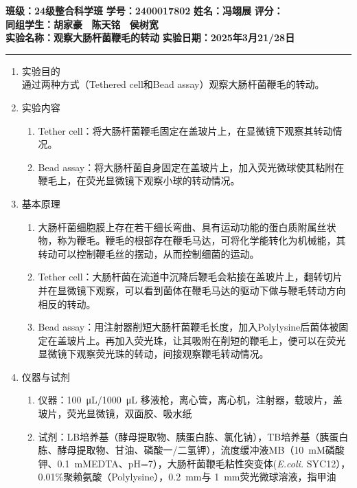 \documentclass[a4paper]{article}
\begin{document}
\noindent\textbf{班级：24级整合科学班} \hspace{1cm} \textbf{学号：2400017802} \hspace{1cm} \textbf{姓名：冯翊展} \hspace{1cm} \textbf{评分：}\\
\textbf{同组学生：胡家豪 \ 陈天铭 \ 侯树宽} \\
\textbf{实验名称：观察大肠杆菌鞭毛的转动}   \hfill \textbf{实验日期：2025年3月21/28日} 

\hrule
\vspace{3mm}

\begin{enumerate}[label=\chinese*.,left=0pt]
    \item 实验目的
    \\
    通过两种⽅式（Tethered cell和Bead assay）观察⼤肠杆菌鞭⽑的转动。
    
    \item 实验内容
    \begin{enumerate}[label=\arabic*.,left = 0pt]
        \item Tether cell：将⼤肠杆菌鞭⽑固定在盖玻⽚上，在显微镜下观察其转动情况。
        \item Bead assay：将大肠杆菌自身固定在盖玻片上，加入荧光微球使其粘附在鞭毛上，在荧光显微镜下观察小球的转动情况。
    \end{enumerate}
    
    \item 基本原理
    \begin{enumerate}[label=\arabic*.,left = 0pt]
        \item ⼤肠杆菌细胞膜上存在若⼲细长弯曲、具有运动功能的蛋白质附属丝状物，称为鞭毛。鞭毛的根部存在鞭毛马达，可将化学能转化为机械能，其转动可以控制鞭毛丝的摆动，从而控制细菌的运动。
        \item Tether cell：大肠杆菌在流道中沉降后鞭⽑会粘接在盖玻⽚上，翻转切⽚并在显微镜下观察，可以看到菌体在鞭⽑⻢达的驱动下做与鞭⽑转动⽅向相反的转动。
        \item Bead assay：⽤注射器削短⼤肠杆菌鞭⽑⻓度，加入Polylysine后菌体被固定在盖玻⽚上。再加⼊荧光珠，让其吸附在削短的鞭⽑上，便可以在荧光显微镜下观察荧光珠的转动，间接观察鞭⽑转动情况。
    \end{enumerate}
    
    \item 仪器与试剂
    \begin{enumerate}[label = \arabic*., left = 0pt]
        \item 仪器：\qty{100}{\micro \L}/\qty{1000}{\micro \L} 移液枪，离心管，离心机，注射器，载玻片，盖玻片，荧光显微镜，双⾯胶、吸⽔纸
        \item 试剂：LB培养基（酵母提取物、胰蛋白胨、氯化钠），TB培养基（胰蛋白胨、酵母提取物、甘油、磷酸一/二氢钾），流度缓冲液MB（\qty{10}{\milli M}磷酸钾、\qty{0.1}{\milli M}EDTA、pH=7），大肠杆菌鞭毛粘性突变体(\textit{E.coli.} SYC12），0.01\%聚赖氨酸（Polylysine），\qty{0.2}{\milli \m}与 \qty{1}{\milli \m}荧光微球溶液，指甲油
    \end{enumerate}


\end{enumerate}
\end{document}
